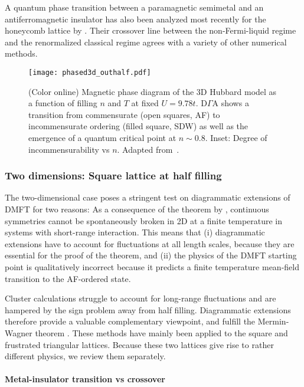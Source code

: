 \documentclass[rmp,aps,reprint,amsmath,amssymb,superscriptaddress,showpacs,nofootinbib]{revtex4-1}
\begin{document}
A quantum phase transition between a paramagnetic semimetal and an antiferromagnetic insulator has also been analyzed most recently for the honeycomb lattice by . Their crossover line between the non-Fermi-liquid regime and the renormalized classical regime agrees with a variety of other numerical methods.

\begin{figure}[t]
  \texttt{[image: phased3d\_outhalf.pdf]} 
    \caption{(Color online) Magnetic phase diagram of the 3D Hubbard model as a function of filling $n$ and $T$ at fixed $U= 9.78 t$. D$\Gamma$A shows a transition from commensurate (open squares, AF)  to incommensurate ordering (filled square, SDW) as well as the emergence of a quantum critical point at $n\sim0.8$. Inset: Degree of incommensurability vs $n$. Adapted from~.}
  \label{fig:pd3d-out}
\end{figure}

\subsubsection{Two dimensions: Square lattice at half filling}
\label{sec:2dhubbsquare}

The two-dimensional case poses a stringent test on diagrammatic extensions of DMFT for two reasons: As a consequence of the theorem by , continuous symmetries cannot be spontaneously broken in 2D at a finite temperature in systems with short-range interaction. This means that (i) diagrammatic extensions have to account for fluctuations at all length scales, because they are essential for the proof of the theorem, and (ii) the physics of the DMFT starting point is qualitatively incorrect because it predicts a finite temperature mean-field transition to the AF-ordered state.

Cluster calculations struggle to account for long-range fluctuations and are hampered by the sign problem away from half filling. Diagrammatic extensions therefore provide a valuable complementary viewpoint, and fulfill the Mermin-Wagner theorem \cite{Katanin2009}. These methods have mainly been applied to the square and frustrated triangular lattices. Because these two lattices give rise to rather different physics, we review them separately.

\paragraph*{Metal-insulator transition vs crossover}
\end{document}
